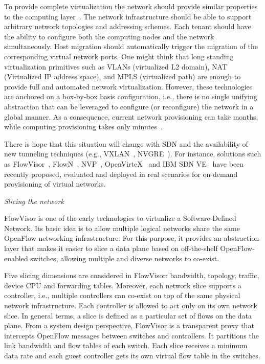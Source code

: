 To provide complete virtualization the network should provide similar properties to the computing layer~\cite{chowdhury2010}.
The network infrastructure should be able to support arbitrary network topologies and addressing schemes.
Each tenant should have the ability to configure both the computing nodes and the network simultaneously.
Host migration should automatically trigger the migration of the corresponding virtual network ports.
One might think that long standing virtualization primitives such as VLANs (virtualized L2 domain), NAT (Virtualized IP address space), and 
MPLS (virtualized path) are enough to provide full and automated network virtualization.
However, these  technologies are anchored on a box-by-box basis configuration, i.e., there is no single unifying 
abstraction that can be leveraged to configure (or reconfigure) the network in a global manner.
As a consequence, current network provisioning can take months, while computing provisioning takes only 
minutes~\cite{koponen,cearley2013,peng2012,zhang2014}.

There is hope that this situation will change with SDN and the availability of new tunneling techniques (e.g., VXLAN~\cite{mahalingam2013}, NVGRE~\cite{sridharan2013}).
For instance, solutions such as FlowVisor~\cite{sherwood2009,sherwood2010,azodolmolky2012},  FlowN~\cite{drutskoy2012}, NVP~\cite{koponen}, OpenVirteX~\cite{al-shabibi2014} and IBM SDN VE~\cite{racherla2014,li2014}
have been recently proposed, evaluated and deployed in real scenarios for on-demand provisioning of virtual 
networks.

\vspace{2mm}
\noindent \textit{Slicing the network}

FlowVisor is one of the early technologies to virtualize a Software-Defined Network.
Its basic idea is to allow multiple logical networks share the same OpenFlow networking infrastructure.
For this purpose, it provides an abstraction layer that makes it easier to slice a data plane based on off-the-shelf OpenFlow-enabled switches, allowing multiple and diverse networks to co-exist. 

Five slicing dimensions are considered in FlowVisor: bandwidth, topology, traffic, device CPU and forwarding 
tables. Moreover, each network slice supports a controller, i.e., multiple controllers can co-exist on top 
of the same physical network infrastructure. Each controller is allowed to act only on its own network slice.
In general terms, a slice is defined as a particular set of flows on the data plane. 
From a system design perspective, FlowVisor is a transparent proxy that intercepts OpenFlow messages between 
switches and controllers. It partitions the link bandwidth and flow tables of each switch. Each slice receives 
a minimum data rate and each guest controller gets its own virtual flow table in the switches.

